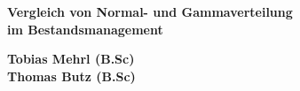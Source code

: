 \documentclass[12pt,a4paper, listof=entryprefix, bibliography=totocnumbered,toc=listofnumbered,footsepline]{scrartcl}
\newcounter{verzeichnis}
\begin{document}
\onehalfspacing	

\begin{center}

	\vspace*{4cm} %
	\Large
	\textbf{Vergleich von Normal- und Gammaverteilung}\\ %
	\large
	\textbf{im Bestandsmanagement}\\ %
		
	\vspace*{8cm} %
	\normalsize
	\begin{center}
	\date{\today}
	\textbf{Tobias Mehrl (B.Sc)}\\ %
	\textbf{Thomas Butz  (B.Sc)}
	\end{center}
\end{center}
\pagebreak

\singlespacing %
\setcounter{section}{0}
\setcounter{page}{1}

\tableofcontents %
\pagebreak

\onehalfspacing %
\renewcommand{\thesection}{\arabic{section}} %
\setcounter{page}{1}	%
\setcounter{section}{0}
\renewcommand{\sectionmark}[1]{\markright{#1}} %
\renewcommand{\subsectionmark}[1]{}            %
\renewcommand{\subsubsectionmark}[1]{}         %






\end{document}
